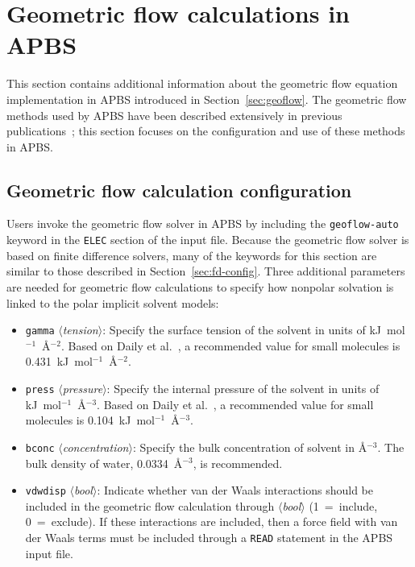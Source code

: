 \documentclass[12pt,titlepage]{article}
\newcommand{\keyword}[1]{\texttt{#1}}
\newcommand{\param}[1]{$\langle$\textit{#1}$\rangle$}
\begin{document}
\section{Geometric flow calculations in APBS} \label{app:geoflow}
This section contains additional information about the geometric flow equation implementation in APBS introduced in Section~\ref{sec:geoflow}.
The geometric flow methods used by APBS have been described extensively in previous publications~\cite{Chen2010, Chen2011, Chen2012, Daily2013, Thomas2013a}; this section focuses on the configuration and use of these methods in APBS.

\subsection{Geometric flow calculation configuration}
Users invoke the geometric flow solver in APBS by including the \keyword{geoflow-auto} keyword in the \keyword{ELEC} section of the input file.
Because the geometric flow solver is based on finite difference solvers, many of the keywords for this section are similar to those described in Section~\ref{sec:fd-config}.
Three additional parameters are needed for geometric flow calculations to specify how nonpolar solvation is linked to the polar implicit solvent models:
\begin{itemize}
	\item \keyword{gamma} \param{tension}:  Specify the surface tension of the solvent in units of kJ~mol$^{-1}$~\AA$^{-2}$.
	Based on Daily et al.~\cite{Daily2013}, a recommended value for small molecules is 0.431~kJ~mol$^{-1}$~\AA$^{-2}$.
	\item \keyword{press} \param{pressure}:  Specify the internal pressure of the solvent in units of kJ~mol$^{-1}$~\AA$^{-3}$.
	Based on Daily et al.~\cite{Daily2013}, a recommended value for small molecules is 0.104~kJ~mol$^{-1}$~\AA$^{-3}$.
	\item \keyword{bconc} \param{concentration}:  Specify the bulk concentration of solvent in \AA$^{-3}$.
	The bulk density of water, 0.0334~\AA$^{-3}$, is recommended.
	\item \keyword{vdwdisp} \param{bool}:  Indicate whether van der Waals interactions should be included in the geometric flow calculation through \param{bool} (1~=~include, 0~=~exclude).
	If these interactions are included, then a force field with van der Waals terms must be included through a \keyword{READ} statement in the APBS input file.
\end{itemize}
\end{document}
